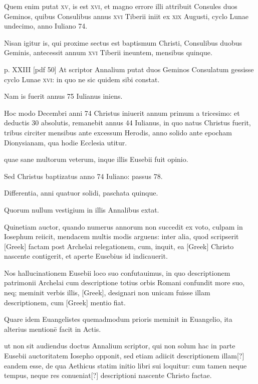 \begin{parnumbers}
Quem enim putat \textsc{xv}, is est \textsc{xvi}, et magno errore illi
attribuit Consules duos Geminos, quibus Consulibus annus \textsc{xvi}
Tiberii iniit ex \textsc{xix} Augusti, cyclo Lunae undecimo, anno Iuliano
74.

Nisan igitur is, qui proxime sectus est baptismum Christi,
Consulibus duobus Geminis, antecessit annum \textsc{xvi} Tiberii ineuntem,
mensibus quinque.

\clearpage
p. XXIII [pdf 50]
At scriptor Annalium putat duos Geminos
Consulatum gessisse cyclo Lunae \textsc{xvi}: in quo ne sic quidem
sibi constat.

Nam is fuerit annus 75 Iulianus iniens.

Hoc modo Decembri anni 74 Christus iniuerit annum primum a tricesimo: et
deductis 30 absolutis, remanebit annus 44 Iulianus, in quo natus
Christus fuerit, tribus circiter mensibus ante excessum Herodis, anno
solido ante epocham Dionysianam, qua hodie Ecclesia utitur.

quae sane multorum veterum, inque illis Eusebii fuit opinio.

Sed
Christus baptizatus anno 74 Iuliano: passus 78.

Differentia, anni
quatuor solidi, paschata quinque.

Quorum nullum vestigium in illis
Annalibus extat.

Quinetiam auctor, quando numerus annorum
non succedit ex voto, culpam in Iosephum reiicit, mendacem multis
modis arguens: inter alia, quod scripserit \textgreek{[Greek]} factam post
Archelai relegationem, cum, inquit, ea \textgreek{[Greek]} Christo nascente
contigerit, et aperte Eusebius id indicauerit.

Nos hallucinationem
Eusebii loco suo confutauimus, in quo descriptionem patrimonii
Archelai cum descriptione totius orbis Romani confundit more
suo, neq; meminit verbis illis, \textgreek{[Greek]}, designari non
unicam fuisse illam descriptionem, cum \textgreek{[Greek]} mentio fiat.

Quare
idem Euangelistes quemadmodum prioris meminit in Euangelio,
ita alterius mentionē facit in Actis.

ut non sit audiendus doctus Annalium
scriptor, qui non solum hac in parte Eusebii auctoritatem
Iosepho opponit, sed etiam adiicit descriptionem illam[?] eandem esse,
de qua Aethicus statim initio libri sui loquitur: cum tamen neque
tempus, neque res conueniat[?] descriptioni nascente Christo factae.


\end{parnumbers}
